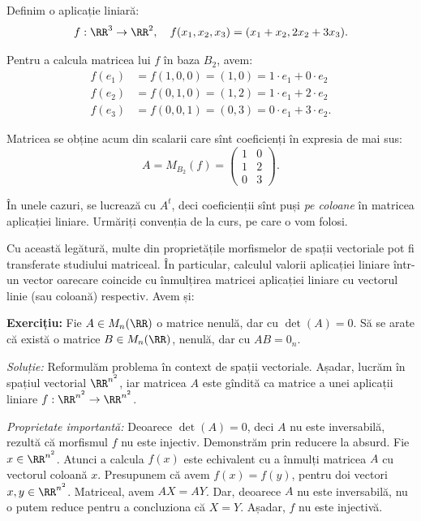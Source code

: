 Definim o aplicație liniară:
\[
  f : \RR^3 \to \RR^2, \quad f(x_1, x_2, x_3) = (x_1 + x_2, 2x_2 + 3x_3).
\]

Pentru a calcula matricea lui $f$ în baza $B_2$, avem:
\begin{align*}
  f(e_1) &= f(1, 0, 0) = (1, 0) = 1 \cdot e_1 + 0 \cdot e_2 \\
  f(e_2) &= f(0, 1, 0) = (1, 2) = 1 \cdot e_1 + 2 \cdot e_2 \\
  f(e_3) &= f(0, 0, 1) = (0, 3) = 0 \cdot e_1 + 3 \cdot e_2.
\end{align*}

Matricea se obține acum din scalarii care sînt coeficienți în expresia de mai sus:
\[
  A = M_{B_2}(f) =
  \begin{pmatrix}
    1 & 0 \\
    1 & 2 \\
    0 & 3
  \end{pmatrix}.
\]

\begin{remark}\label{rk:sau-trans}
  În unele cazuri, se lucrează cu $A^t$, deci coeficienții sînt puși \emph{pe coloane}
  în matricea aplicației liniare. Urmăriți convenția de la curs, pe care o vom folosi.
\end{remark}

Cu această legătură, multe din proprietățile morfismelor de spații vectoriale pot fi
transferate studiului matriceal. În particular, calculul valorii aplicației liniare
într-un vector oarecare coincide cu înmulțirea matricei aplicației liniare cu vectorul
linie (sau coloană) respectiv. Avem și:

\textbf{Exercițiu:} Fie $A \in M_n(\RR)$ o matrice nenulă, dar cu $\det(A) = 0$.
Să se arate că există o matrice $B \in M_n(\RR)$, nenulă, dar cu $AB = 0_n$.

\emph{Soluție:} Reformulăm problema în context de spații vectoriale. Așadar,
lucrăm în spațiul vectorial $\RR^{n^2}$, iar matricea $A$ este gîndită ca matrice
a unei aplicații liniare $f : \RR^{n^2} \to \RR^{n^2}$.

\emph{Proprietate importantă:} Deoarece $\det(A) = 0$, deci $A$ nu este inversabilă,
rezultă că morfismul $f$ nu este injectiv. Demonstrăm prin reducere la absurd. Fie
$x \in \RR^{n^2}$. Atunci a calcula $f(x)$ este echivalent cu a înmulți matricea $A$
cu vectorul coloană $x$. Presupunem că avem $f(x) = f(y)$, pentru doi vectori
$x, y \in \RR^{n^2}$. Matriceal, avem $AX = AY$. Dar, deoarece $A$ nu este inversabilă,
nu o putem reduce pentru a concluziona că $X = Y$. Așadar, $f$ nu este injectivă.

